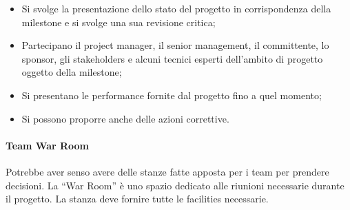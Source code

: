 \begin{itemize}
	\begin{itemize}
		\item Si svolge la presentazione dello stato del progetto in corrispondenza della milestone e si svolge una sua revisione critica;
		\item Partecipano il project manager, il senior management, il committente, lo sponsor, gli stakeholders e alcuni tecnici esperti dell’ambito di progetto oggetto della milestone;
		\item Si presentano le performance fornite dal progetto fino a quel momento;
		\item Si possono proporre anche delle azioni correttive.
	\end{itemize}
\end{itemize}
\paragraph{Team War Room}
Potrebbe aver senso avere delle stanze fatte apposta per i team per prendere decisioni. La “War Room” è uno spazio dedicato alle riunioni necessarie durante il progetto. La stanza deve fornire tutte le facilities necessarie.
